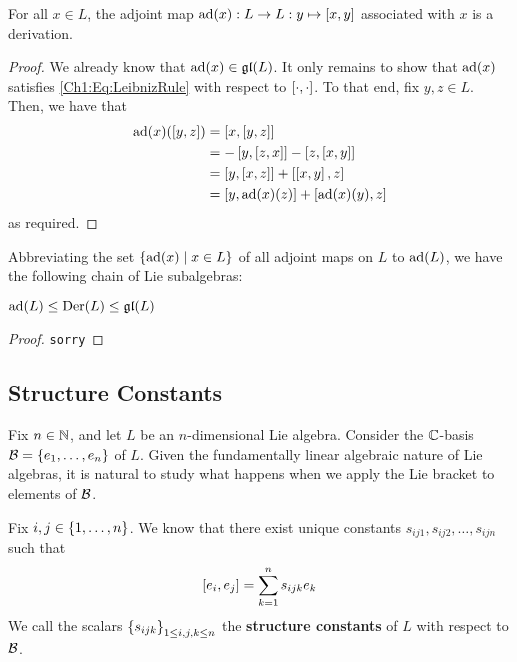 \begin{boxproposition}
    For all $x \in L$, the adjoint map $\operatorname{ad}\!\left( x \right) : L \to L : y \mapsto \left[ x, y \right]$ associated with $x$ is a derivation.
\end{boxproposition}
\begin{proof}
    We already know that $\operatorname{ad}\!\left( x \right) \in \mathfrak{gl}\!\left( L \right)$. It only remains to show that $\operatorname{ad}\!\left( x \right)$ satisfies \eqref{Ch1:Eq:LeibnizRule} with respect to $\left[ \cdot, \cdot \right]$. To that end, fix $y, z \in L$. Then, we have that
    \begin{align*}
        \operatorname{ad}\!\left( x \right)\!\left( \left[ y, z \right] \right)
        &= \left[ x, \left[ y, z \right] \right] \\
        &= - \left[ y, \left[ z, x \right] \right] - \left[ z, \left[ x, y \right] \right] \\
        &= \left[ y, \left[ x, z \right] \right] + \left[ \left[ x, y \right], z \right] \\
        &= \left[ y, \operatorname{ad}\!\left( x \right)\!(z) \right] + \left[ \operatorname{ad}\!\left( x \right)\!(y), z \right]
    \end{align*}
    as required.
\end{proof}

Abbreviating the set $\left\{ \operatorname{ad}\!\left( x \right) \; \middle\vert \; x \in L \right\}$ of all adjoint maps on $L$ to $\operatorname{ad}\!\left( L \right)$, we have the following chain of Lie subalgebras:

\begin{boxlemma}
    $\operatorname{ad}\!\left( L \right) \leq \operatorname{Der}\!\left( L \right) \leq \mathfrak{gl}\!\left( L \right)$
\end{boxlemma}
\begin{proof}
    \verb|sorry|
\end{proof}

\subsection{Structure Constants}

Fix $n \in \mathbb{N}$, and let $L$ be an $n$-dimensional Lie algebra. Consider the $\mathbb{C}$-basis $\mathcal{B} = \left\{ e_1, \ldots, e_n \right\}$ of $L$. Given the fundamentally linear algebraic nature of Lie algebras, it is natural to study what happens when we apply the Lie bracket to elements of $\mathcal{B}$.

\begin{boxdefinition}
    Fix $i, j \in \left\{ 1, \ldots, n \right\}$. We know that there exist unique constants $s_{ij1}, s_{ij2}, \ldots, s_{ijn}$ such that
    \begin{align*}
        \left[ e_i, e_j \right] = \sum_{k = 1}^{n} s_{ijk} e_k
    \end{align*}
    We call the scalars $\left\{ s_{ijk} \right\}_{1 \leq i, j, k \leq n}$ the \textbf{structure constants} of $L$ with respect to $\mathcal{B}$.
\end{boxdefinition}


